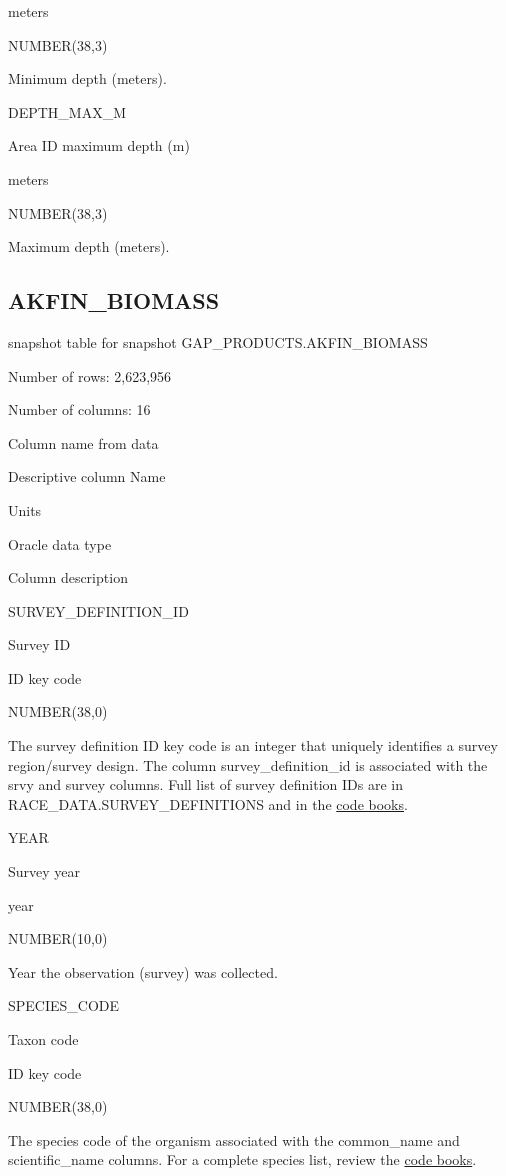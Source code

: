 \documentclass[
  letterpaper,
  oneside,
  open=any]{scrbook}
\begin{document}
meters

NUMBER(38,3)

Minimum depth (meters).

DEPTH\_MAX\_M

Area ID maximum depth (m)

meters

NUMBER(38,3)

Maximum depth (meters).

\subsection{AKFIN\_BIOMASS}\label{akfin_biomass}

snapshot table for snapshot GAP\_PRODUCTS.AKFIN\_BIOMASS

Number of rows: 2,623,956

Number of columns: 16

Column name from data

Descriptive column Name

Units

Oracle data type

Column description

SURVEY\_DEFINITION\_ID

Survey ID

ID key code

NUMBER(38,0)

The survey definition ID key code is an integer that uniquely identifies
a survey region/survey design. The column survey\_definition\_id is
associated with the srvy and survey columns. Full list of survey
definition IDs are in RACE\_DATA.SURVEY\_DEFINITIONS and in the
\href{https://www.fisheries.noaa.gov/resource/document/groundfish-survey-species-code-manual-and-data-codes-manual}{code
books}.

YEAR

Survey year

year

NUMBER(10,0)

Year the observation (survey) was collected.

SPECIES\_CODE

Taxon code

ID key code

NUMBER(38,0)

The species code of the organism associated with the common\_name and
scientific\_name columns. For a complete species list, review the
\href{https://www.fisheries.noaa.gov/resource/document/groundfish-survey-species-code-manual-and-data-codes-manual}{code
books}.
\end{document}
